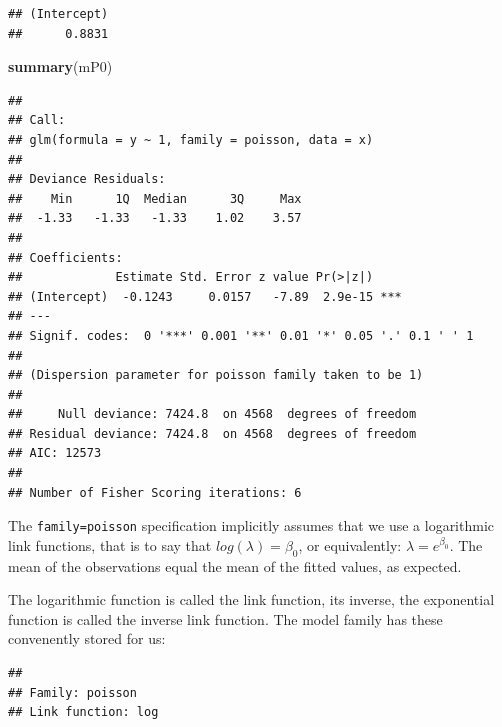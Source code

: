 \documentclass[12pt,]{book}
\newenvironment{Shaded}{\begin{snugshade}}{\end{snugshade}}
\newcommand{\KeywordTok}[1]{\textcolor[rgb]{0.13,0.29,0.53}{\textbf{#1}}}
\newcommand{\NormalTok}[1]{#1}
\newcommand{\OperatorTok}[1]{\textcolor[rgb]{0.81,0.36,0.00}{\textbf{#1}}}
\begin{document}
\begin{verbatim}
## (Intercept) 
##      0.8831
\end{verbatim}

\begin{Shaded}
\begin{Highlighting}[]
\KeywordTok{summary}\NormalTok{(mP0)}
\end{Highlighting}
\end{Shaded}

\begin{verbatim}
## 
## Call:
## glm(formula = y ~ 1, family = poisson, data = x)
## 
## Deviance Residuals: 
##    Min      1Q  Median      3Q     Max  
##  -1.33   -1.33   -1.33    1.02    3.57  
## 
## Coefficients:
##             Estimate Std. Error z value Pr(>|z|)    
## (Intercept)  -0.1243     0.0157   -7.89  2.9e-15 ***
## ---
## Signif. codes:  0 '***' 0.001 '**' 0.01 '*' 0.05 '.' 0.1 ' ' 1
## 
## (Dispersion parameter for poisson family taken to be 1)
## 
##     Null deviance: 7424.8  on 4568  degrees of freedom
## Residual deviance: 7424.8  on 4568  degrees of freedom
## AIC: 12573
## 
## Number of Fisher Scoring iterations: 6
\end{verbatim}

The \texttt{family=poisson} specification implicitly assumes that we use a logarithmic link functions,
that is to say that \(log(\lambda) = \beta_0\), or equivalently: \(\lambda = e^{\beta_0}\).
The mean of the observations equal the mean of the fitted values, as expected.

The logarithmic function is called the link function, its inverse, the exponential function
is called the inverse link function. The model family has these convenently stored for us:

\begin{Shaded}
\end{Shaded}

\begin{verbatim}
## 
## Family: poisson 
## Link function: log
\end{verbatim}

\begin{Shaded}
\end{Shaded}
\end{document}
